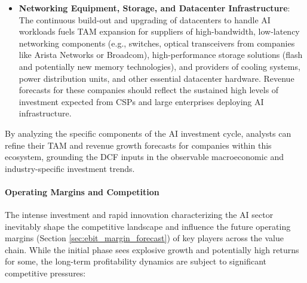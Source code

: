 \begin{itemize}
    \item \textbf{Networking Equipment, Storage, and Datacenter Infrastructure}: The continuous build-out and upgrading of datacenters to handle AI workloads fuels TAM expansion for suppliers of high-bandwidth, low-latency networking components (e.g., switches, optical transceivers from companies like Arista Networks or Broadcom), high-performance storage solutions (flash and potentially new memory technologies), and providers of cooling systems, power distribution units, and other essential datacenter hardware. Revenue forecasts for these companies should reflect the sustained high levels of investment expected from CSPs and large enterprises deploying AI infrastructure.
\end{itemize}
By analyzing the specific components of the AI investment cycle, analysts can refine their TAM and revenue growth forecasts for companies within this ecosystem, grounding the DCF inputs in the observable macroeconomic and industry-specific investment trends.

\paragraph{Operating Margins and Competition} \label{par:ai_margins_competition}
The intense investment and rapid innovation characterizing the AI sector inevitably shape the competitive landscape and influence the future operating margins (Section \ref{sec:ebit_margin_forecast}) of key players across the value chain. While the initial phase sees explosive growth and potentially high returns for some, the long-term profitability dynamics are subject to significant competitive pressures:

